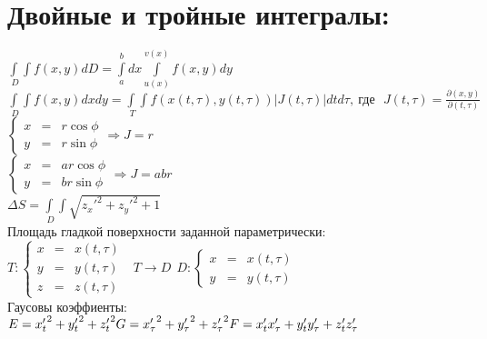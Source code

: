\documentclass[12pt, a4paper]{article}
\begin{document}
 \par \- \newline
\newpage
\section{Двойные и тройные интегралы:}
$\displaystyle \int\limits_{ \ D}\!\!\!\!\int{f(x,y)dD} = \int\limits_a^b{dx}\int\limits_{u(x)}^{v(x)}{f(x,y) dy} $ \\
$\displaystyle \int\limits_{ \ D}\!\!\!\!\int{f(x,y)dxdy} = \int\limits_{ \ T}\!\!\!\!\int{f(x(t,\tau),y(t,\tau))\left|J(t,\tau)\right|dtd\tau},\ \text{где}\ \ \ J(t,\tau) = \frac{\partial(x,y)}{\partial(t,\tau)} $ \\
$\displaystyle \left\{ \begin{array}{lll}
        									x & = & r\cos \phi \\
				             			y & = & r\sin \phi
					           \end{array}
							 \right. \Rightarrow J = r$ \\
$\displaystyle \left\{ \begin{array}{lll}
        									x & = & ar\cos \phi \\
				             			y & = & br\sin \phi
					           \end{array}
							 \right. \Rightarrow J = abr$ \\
$\displaystyle \Delta S = \int\limits_{ \ D}\!\!\!\!\int{\sqrt{{z_x'}^2+{z_y'}^2+1}} $ \\	
Площадь гладкой поверхности заданной параметрически: \\
$\displaystyle  T: \left\{ \begin{array}{lll}
        									x & = & x(t,\tau) \\
				             			y & = & y(t,\tau) \\
				             			z & = & z(t,\tau)
					           \end{array}
							 \right.\ \ \ T\rightarrow D \ \ D: \left\{ \begin{array}{lll}
        									x & = & x(t,\tau) \\
				             			y & = & y(t,\tau)
				           \end{array}
							 \right.$ \\
Гаусовы коэффиенты: \\ 
$E={x_t'}^2+{y_t'}^2+{z_t'}^2 \\
G={x_{\tau}'}^2+{y_{\tau}'}^2+{z_{\tau}'}^2 \\
F=x_t'x_{\tau}'+y_t'y_{\tau}'+z_t'z_{\tau}'$ \\
\end{document}

